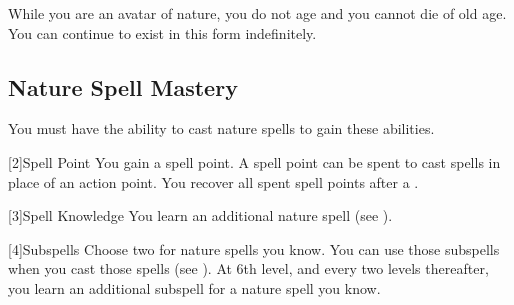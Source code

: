         While you are an avatar of nature, you do not age and you cannot die of old age.
        You can continue to exist in this form indefinitely.

    \subsection{Nature Spell Mastery}
        You must have the ability to cast nature spells to gain these abilities.

        [2]{Spell Point}
        You gain a spell point.
        A spell point can be spent to cast spells in place of an action point.
        You recover all spent spell points after a .

        [3]{Spell Knowledge} 
        You learn an additional nature spell (see ).

        [4]{Subspells}
        Choose two  for nature spells you know.
        You can use those subspells when you cast those spells (see ).
        At 6th level, and every two levels thereafter, you learn an additional subspell for a nature spell you know.

